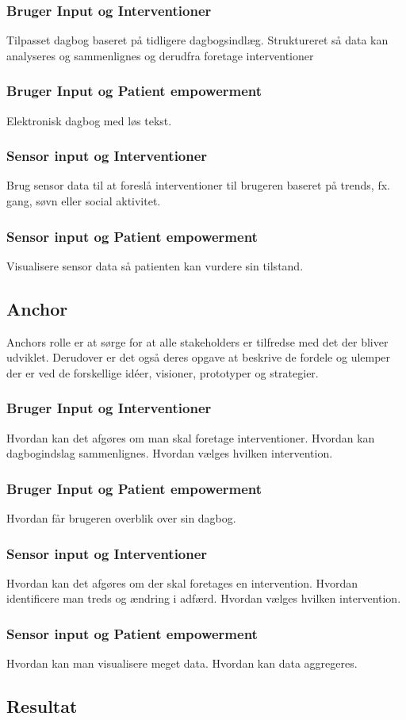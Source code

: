 \subsubsection*{Bruger Input og Interventioner}
Tilpasset dagbog baseret på tidligere dagbogsindlæg.
Struktureret så data kan analyseres og sammenlignes og derudfra foretage interventioner
\subsubsection*{Bruger Input og Patient empowerment}
Elektronisk dagbog med løs tekst.
\subsubsection*{Sensor input og Interventioner} 
Brug sensor data til at foreslå interventioner til brugeren baseret på trends, fx. gang, søvn eller social aktivitet.
\subsubsection*{Sensor input og Patient empowerment}
Visualisere sensor data så patienten kan vurdere sin tilstand.

\subsection{Anchor}
Anchors rolle er at sørge for at alle stakeholders er tilfredse med det der bliver udviklet.
Derudover er det også deres opgave at beskrive de fordele og ulemper der er ved de forskellige idéer, visioner, prototyper og strategier.

\subsubsection*{Bruger Input og Interventioner}
Hvordan kan det afgøres om man skal foretage interventioner.
Hvordan kan dagbogindslag sammenlignes.
Hvordan vælges hvilken intervention.
\subsubsection*{Bruger Input og Patient empowerment}
Hvordan får brugeren overblik over sin dagbog.
\subsubsection*{Sensor input og Interventioner} 
Hvordan kan det afgøres om der skal foretages en intervention.
Hvordan identificere man treds og ændring i adfærd.
Hvordan vælges hvilken intervention.
\subsubsection*{Sensor input og Patient empowerment}
Hvordan kan man visualisere meget data.
Hvordan kan data aggregeres.

\subsection{Resultat}







